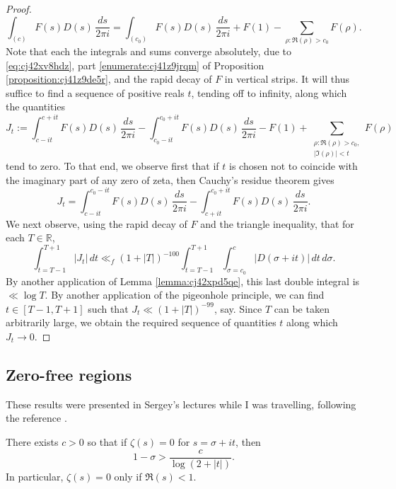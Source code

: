 \documentclass[reqno]{amsart}  \numberwithin{theorem}{section} \numberwithin{equation}{section}
\begin{document}
\begin{proof}
  \begin{equation*}
    \int_{(c)} F(s)  D(s) \, \frac{d s}{2 \pi i }
    =
    \int_{(c_0)} F(s)  D(s) \, \frac{d s}{2 \pi i }
    +
    F(1) 
    -
    \sum_{\rho : \Re(\rho) > c_0 } F(\rho) .
  \end{equation*}
  Note that each the integrals and sums converge absolutely, due to \eqref{eq:cj42xv8hdz}, part \eqref{enumerate:cj41z9jrqm} of Proposition \ref{proposition:cj41z9de5r}, and the rapid decay of $F$ in vertical strips.  It will thus suffice to find a sequence of positive reals $t$, tending off to infinity, along which the quantities
  \begin{equation*}
    J_t := \int_{c - i t}^{c + i t} F(s)  D(s) \, \frac{d s}{2 \pi i }
    -
    \int_{c_0 - i t}^{c_0 + i t} F(s)  D(s) \, \frac{d s}{2 \pi i }
    -
    F(1) 
    +
    \sum_{
      \substack{
        \rho : \Re(\rho) > c_0,   \\
        \lvert \Im(\rho) \rvert < t
      }
    } F(\rho) 
  \end{equation*}
  tend to zero.  To that end, we observe first that if $t$ is chosen not to coincide with the imaginary part of any zero of zeta, then Cauchy's residue theorem gives
  \begin{equation*}
    J_t =
    \int_{c - i t}^{c_0 - it}
    F(s)  D(s) \, \frac{d s}{2 \pi i }
    -
    \int_{c + i t}^{c_0 + it}
    F(s)  D(s) \, \frac{d s}{2 \pi i }.
  \end{equation*}
  We next observe, using the rapid decay of $F$ and the triangle inequality, that for each $T \in \mathbb{R}$,
  \begin{equation*}
    \int_{t = T-1}^{T + 1}\left\lvert J_t \right\rvert \, d t \ll_{f} \left(1 + |T|\right)^{-100}
    \int_{t = T - 1}^{T + 1} \int_{\sigma = c_0}^{c}  \lvert D(\sigma + i t) \rvert \, d t \, d \sigma.
  \end{equation*}
  By another application of Lemma \ref{lemma:cj42xpd5qe}, this last double integral is $\ll \log T$.  By another application of the pigeonhole principle, we can find $t \in [T-1,T+1]$ such that $J_t \ll (1 + \lvert T \rvert)^{-99}$, say.  Since $T$ can be taken arbitrarily large, we obtain the required sequence of quantities $t$ along which $J_t \rightarrow 0$.
\end{proof}

\subsection{Zero-free regions}
These results were presented in Sergey's lectures while I was travelling, following the reference \cite[\S3]{MR882550}.
\begin{theorem}\label{theorem:cj541i3g6o}
  There exists $c > 0$ so that if $\zeta(s) = 0$ for $s = \sigma + i t$, then
  \begin{equation*}
    1 - \sigma > \frac{c}{\log (2 + \lvert t \rvert)}.
  \end{equation*}
  In particular, $\zeta(s) = 0$ only if $\Re(s) < 1$.
\end{theorem}
\end{document}
